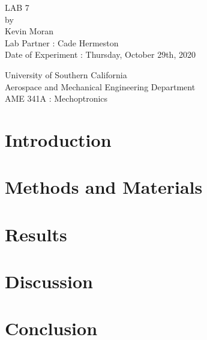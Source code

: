 \documentclass[letterpaper,12pt]{article}
\begin{document}
\begin{titlepage}
 \begin{center}
 \vspace*{1in}
{\Huge LAB 7}\\
    \bigskip
    by\\
    \bigskip
    {\Large Kevin Moran} \\
    \bigskip
    Lab Partner : Cade Hermeston\\
    Date of Experiment : Thursday, October 29th, 2020

    \bigskip\bigskip\bigskip
    University of Southern California\\
    Aerospace and Mechanical Engineering Department\\
    AME 341A : Mechoptronics
 \end{center}
\end{titlepage}
\begin{abstract}
    
\end{abstract}

\section{Introduction}

\section{Methods and Materials}

\section{Results}

\section{Discussion}

\section{Conclusion}
\end{document}
